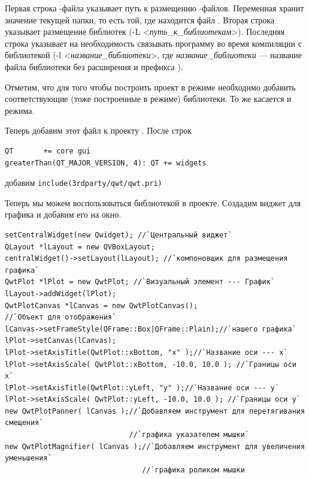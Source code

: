 Первая строка -файла указывает путь к размещению
-файлов. Переменная 
 хранит значение текущей папки, то есть той, где
находится файл . Вторая строка указывает размещение библиотек
(-L <\emph{путь\_к\_библиотекам}>). Последняя строка указывает на
необходимость связывать программу во время компиляции с библиотекой 
(-l <\emph{название\_библиотеки}>, где \emph{название\_библиотеки} ---
название файла библиотеки без расширения и префикса ).

Отметим, что для того чтобы построить проект в  режиме необходимо добавить соответствующие (тоже построенные в
 режиме) библиотеки. То же касается и  режима. 

Теперь добавим этот файл к проекту . После строк
\begin{lstlisting}
QT       += core gui
greaterThan(QT_MAJOR_VERSION, 4): QT += widgets
\end{lstlisting}
добавим \lstinline!include(3rdparty/qwt/qwt.pri)!

Теперь мы можем воспользоваться библиотекой  в проекте. Создадим виджет для графика и добавим его на окно.
\begin{lstlisting}
setCentralWidget(new Qwidget); //`Центральный виджет`
QLayout *lLayout = new QVBoxLayout;
centralWidget()->setLayout(lLayout); //`компоновщик для размещения графика`
QwtPlot *lPlot = new QwtPlot; //`Визуальный элемент --- График`
lLayout->addWidget(lPlot);
QwtPlotCanvas *lCanvas = new QwtPlotCanvas();
//`Объект для отображения`
lCanvas->setFrameStyle(QFrame::Box|QFrame::Plain);//`нашего графика`
lPlot->setCanvas(lCanvas);
lPlot->setAxisTitle(QwtPlot::xBottom, "x" );//`Название оси --- x`
lPlot->setAxisScale( QwtPlot::xBottom, -10.0, 10.0 ); //`Границы оси x`
lPlot->setAxisTitle(QwtPlot::yLeft, "y" );//`Название оси --- y`
lPlot->setAxisScale( QwtPlot::yLeft, -10.0, 10.0 ); //`Границы оси у`
new QwtPlotPanner( lCanvas );//`Добавляем инструмент для перетягивания смещения` 
                             //`графика указателем мышки`
new QwtPlotMagnifier( lCanvas );//`Добавляем инструмент для увеличения уменьшения`
                                //`графика роликом мышки
\end{lstlisting}

